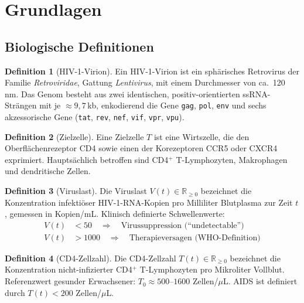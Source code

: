 ﻿\documentclass[a4paper,12pt]{article}
\theoremstyle{definition}
\newtheorem{definition}{Definition}
\begin{document}
\section{Grundlagen}

\subsection{Biologische Definitionen}

\begin{definition}[HIV-1-Virion]
Ein HIV-1-Virion ist ein sph\"arisches Retrovirus der Familie \emph{Retroviridae},
Gattung \emph{Lentivirus}, mit einem Durchmesser von ca.\ 120\,nm.
Das Genom besteht aus zwei identischen, positiv-orientierten ssRNA-Str\"angen
mit je $\approx 9{,}7$\,kb, enkodierend die Gene \texttt{gag}, \texttt{pol}, \texttt{env}
und sechs akzessorische Gene (\texttt{tat}, \texttt{rev}, \texttt{nef}, \texttt{vif},
\texttt{vpr}, \texttt{vpu}).
\end{definition}

\begin{definition}[Zielzelle]
Eine Zielzelle $T$ ist eine Wirtszelle, die den Oberfl\"achenrezeptor CD4 sowie
einen der Korezeptoren CCR5 oder CXCR4 exprimiert. Haupts\"achlich betroffen sind
CD4$^+$ T-Lymphozyten, Makrophagen und dendritische Zellen.
\end{definition}

\begin{definition}[Viruslast]
Die Viruslast $V(t) \in \mathbb{R}_{\geq 0}$ bezeichnet die Konzentration infekti\"oser
HIV-1-RNA-Kopien pro Milliliter Blutplasma zur Zeit $t$, gemessen in Kopien/mL.
Klinisch definierte Schwellenwerte:
\begin{align*}
V(t) &< 50 \quad \Rightarrow \quad \text{Virussuppression (``undetectable'')} \\
V(t) &> 1000 \quad \Rightarrow \quad \text{Therapieversagen (WHO-Definition)}
\end{align*}
\end{definition}

\begin{definition}[CD4-Zellzahl]
Die CD4-Zellzahl $T(t) \in \mathbb{R}_{\geq 0}$ bezeichnet die Konzentration nicht-infizierter
CD4$^+$ T-Lymphozyten pro Mikroliter Vollblut. Referenzwert gesunder Erwachsener:
$T_0 \approx 500$--$1600$ Zellen/$\mu$L. AIDS ist definiert durch $T(t) < 200$ Zellen/$\mu$L.
\end{definition}
\end{document}
